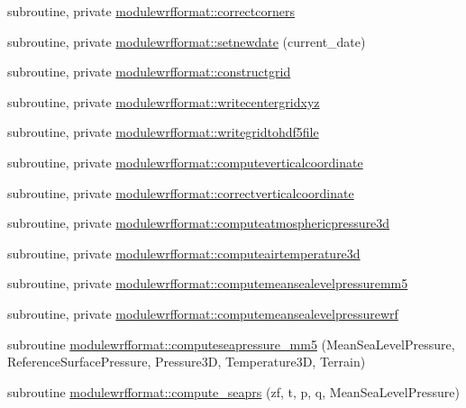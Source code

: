 \begin{DoxyCompactItemize}
\item 
subroutine, private \mbox{\hyperlink{namespacemodulewrfformat_a79b585a2293851b1ed94e43076fb4779}{modulewrfformat\+::correctcorners}}
\item 
subroutine, private \mbox{\hyperlink{namespacemodulewrfformat_a059682013c76ca30c57ffaaa268179f3}{modulewrfformat\+::setnewdate}} (current\+\_\+date)
\item 
subroutine, private \mbox{\hyperlink{namespacemodulewrfformat_aa3ccdff7cc5b06191d188f87afe1905a}{modulewrfformat\+::constructgrid}}
\item 
subroutine, private \mbox{\hyperlink{namespacemodulewrfformat_a731fdf35a2c828689a5ab27bc57be092}{modulewrfformat\+::writecentergridxyz}}
\item 
subroutine, private \mbox{\hyperlink{namespacemodulewrfformat_a05d05aad9544d129c314b6f52333b039}{modulewrfformat\+::writegridtohdf5file}}
\item 
subroutine, private \mbox{\hyperlink{namespacemodulewrfformat_a34fc2d8fa7ad6c853cc7d37d0f31fc9b}{modulewrfformat\+::computeverticalcoordinate}}
\item 
subroutine, private \mbox{\hyperlink{namespacemodulewrfformat_ac71176572d5f88cc34053061c13c6256}{modulewrfformat\+::correctverticalcoordinate}}
\item 
subroutine, private \mbox{\hyperlink{namespacemodulewrfformat_a58297fbd73eaef7ca87327428170f1aa}{modulewrfformat\+::computeatmosphericpressure3d}}
\item 
subroutine, private \mbox{\hyperlink{namespacemodulewrfformat_a73668be1d5f33f4ede49ed82d12aa794}{modulewrfformat\+::computeairtemperature3d}}
\item 
subroutine, private \mbox{\hyperlink{namespacemodulewrfformat_ab2193cc6ab00a1375b87ea785f839b04}{modulewrfformat\+::computemeansealevelpressuremm5}}
\item 
subroutine, private \mbox{\hyperlink{namespacemodulewrfformat_afda201375ff1c4cfb0d863734c03535c}{modulewrfformat\+::computemeansealevelpressurewrf}}
\item 
subroutine \mbox{\hyperlink{namespacemodulewrfformat_ad1de435678b34be1e80362a0f088aacc}{modulewrfformat\+::computeseapressure\+\_\+mm5}} (Mean\+Sea\+Level\+Pressure, Reference\+Surface\+Pressure, Pressure3D, Temperature3D, Terrain)
\item 
subroutine \mbox{\hyperlink{namespacemodulewrfformat_a06aace8368c071a4250a6cebdbf4bba7}{modulewrfformat\+::compute\+\_\+seaprs}} (zf, t, p, q, Mean\+Sea\+Level\+Pressure)
\item 

\end{DoxyCompactItemize}
